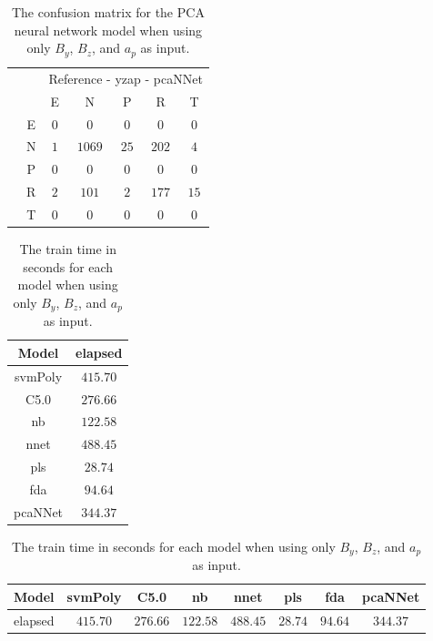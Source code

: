 \begin{table}[!ht]
	\centering
	\begin{tabular}{|c|c|c|c|c|c|c|}
		\cline{3-7}
		\multicolumn{2}{c|}{} & \multicolumn{5}{|c|}{Reference - yzap - pcaNNet} \\ \cline{3-7}
		\multicolumn{2}{c|}{} & E & N & P & R & T \\ \hline
		\multirow{5}{*}{\rotatebox{90}{Prediction}} & E & $0$ & $0$ & $0$ & $0$ & $0$ \\ \cline{2-7}
		 & N & $1$ & $1069$ & $25$ & $202$ & $4$ \\ \cline{2-7}
		 & P & $0$ & $0$ & $0$ & $0$ & $0$ \\ \cline{2-7}
		 & R & $2$ & $101$ & $2$ & $177$ & $15$ \\ \cline{2-7}
		 & T & $0$ & $0$ & $0$ & $0$ & $0$ \\ \hline
	\end{tabular}
	\caption{The confusion matrix for the PCA neural network model when using only $B_{y}$, $B_{z}$, and $a_{p}$ as input.}
	\label{tab:cm:yzap:pcaNNet}
\end{table}

\begin{table}[!ht]
	\centering
	\begin{tabular}{|c|c|}
		\hline
		Model & elapsed \\ \hline
		svmPoly & $415.70$ \\ \hline
		C5.0 & $276.66$ \\ \hline
		nb & $122.58$ \\ \hline
		nnet & $488.45$ \\ \hline
		pls & $28.74$ \\ \hline
		fda & $94.64$ \\ \hline
		pcaNNet & $344.37$ \\ \hline
	\end{tabular}
	\caption{The train time in seconds for each model when using only $B_{y}$, $B_{z}$, and $a_{p}$ as input.}
	\label{tab:time:yzap:train}
\end{table}

\begin{table}[!ht]
	\centering
	\begin{tabular}{|c|c|c|c|c|c|c|c|}
		\hline
		Model & svmPoly & C5.0 & nb & nnet & pls & fda & pcaNNet \\ \hline
		elapsed & $415.70$ & $276.66$ & $122.58$ & $488.45$ & $28.74$ & $94.64$ & $344.37$ \\ \hline
	\end{tabular}
	\caption{The train time in seconds for each model when using only $B_{y}$, $B_{z}$, and $a_{p}$ as input.}
	\label{tab:time:reverse:yzap:train}
\end{table}

